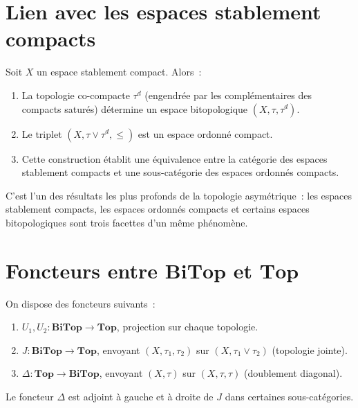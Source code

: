 \section{Lien avec les espaces stablement compacts}

\begin{theoreme}
Soit $X$ un espace stablement compact. Alors~:
\begin{enumerate}
  \item La topologie co-compacte $\tau^d$ (engendr\'ee par les compl\'ementaires des compacts
    satur\'es) d\'etermine un espace bitopologique $(X, \tau, \tau^d)$.
  \item Le triplet $(X, \tau \vee \tau^d, \leq)$ est un espace ordonn\'e compact.
  \item Cette construction \'etablit une \'equivalence entre la cat\'egorie des espaces
    stablement compacts et une sous-cat\'egorie des espaces ordonn\'es compacts.
\end{enumerate}
\end{theoreme}

\begin{remarque}
C'est l'un des r\'esultats les plus profonds de la topologie asym\'etrique~: les espaces
stablement compacts, les espaces ordonn\'es compacts et certains espaces bitopologiques
sont trois facettes d'un m\^eme ph\'enom\`ene.
\end{remarque}

\section{Foncteurs entre $\mathbf{BiTop}$ et $\mathbf{Top}$}

\begin{proposition}
On dispose des foncteurs suivants~:
\begin{enumerate}
  \item $U_1, U_2\colon \mathbf{BiTop} \to \mathbf{Top}$, projection sur chaque topologie.
  \item $J\colon \mathbf{BiTop} \to \mathbf{Top}$, envoyant $(X,\tau_1,\tau_2)$ sur
    $(X, \tau_1 \vee \tau_2)$ (topologie jointe).
  \item $\Delta\colon \mathbf{Top} \to \mathbf{BiTop}$, envoyant $(X,\tau)$ sur
    $(X,\tau,\tau)$ (doublement diagonal).
\end{enumerate}
Le foncteur $\Delta$ est adjoint \`a gauche et \`a droite de $J$ dans certaines
sous-cat\'egories.
\end{proposition}

